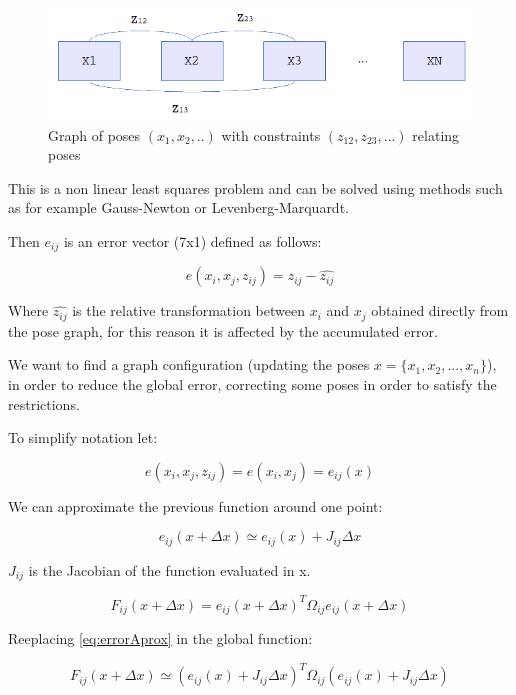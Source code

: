 \begin{figure}[!h]
\begin{center}
\includegraphics[scale=1.5]{images/graph_diagram2}
\caption{Graph of poses $(x_1,x_2,..)$ with constraints $(z_{12},z_{23},...)$ relating poses}
\end{center}
\end{figure}

This is a non linear least squares problem and can be solved using 
methods such as for example Gauss-Newton or Levenberg-Marquardt.


Then $e_{ij}$ is an error vector (7x1) defined as follows:

$$
e(x_i,x_j,z_{ij}) = z_{ij} - \hat{z_{ij}}
$$

Where $\hat{z_{ij}}$ is the relative transformation between $x_i$ and $x_j$ obtained directly from the pose graph, for this reason 
it is affected by the accumulated error.

We want to find a graph configuration (updating the poses $x=\{x_1,x_2,...,x_n\}$), in order to reduce 
the global error, correcting some poses in order to satisfy the restrictions.

To simplify notation let: 

$$
e(x_i,x_j,z_{ij}) = e(x_i,x_j) = e_{ij}(x)
$$

We can approximate the previous function around one point:

\begin{equation}
\label{eq:errorAprox}
e_{ij}(x + \Delta x) \simeq e_{ij}(x) + J_{ij} \Delta x
\end{equation}

$J_{ij}$ is the Jacobian of the function evaluated in x. 


\begin{equation}
\label{eq:globalFunc}
F_{ij}(x + \Delta x) = e_{ij}(x + \Delta x)^T \Omega_{ij}  e_{ij}(x + \Delta x)
\end{equation}

Reeplacing \ref{eq:errorAprox} in the global function:

\begin{equation}
\label{eq:globalFuncAprox}
F_{ij}(x + \Delta x) \simeq (e_{ij}(x) + J_{ij} \Delta x)^T \Omega_{ij}  (e_{ij}(x) + J_{ij} \Delta x)
\end{equation}

